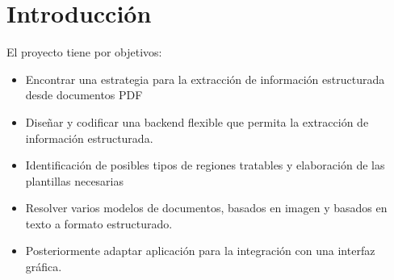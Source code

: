 
\chapter{Introducción}
\label{chap:introduccion}

El proyecto tiene por objetivos:
\begin{itemize}
    \item Encontrar una estrategia para la extracción de información estructurada desde documentos PDF 
    \item Diseñar y codificar una backend flexible que permita la extracción de información estructurada.
    \item Identificación de posibles tipos de regiones tratables y elaboración de las plantillas necesarias
    \item Resolver varios modelos de documentos, basados en imagen y basados en texto a formato estructurado.
    \item Posteriormente adaptar aplicación para la integración con una interfaz gráfica.
\end{itemize}

